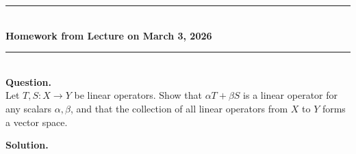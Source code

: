 \documentclass{article}
\begin{document}
\bigskip
\begin{center}
\rule{0.5\textwidth}{1pt}\\[6pt]
\textbf{Homework from Lecture on March 3, 2026}\\[2pt]
\rule{0.5\textwidth}{1pt}
\end{center}
\bigskip

\hfill \break  $~\!\!$ \dotfill \medskip \\
\textbf{Question.}\\
Let $T, S : X \to Y$ be linear operators. Show that $\alpha T + \beta S$ is a linear operator for any scalars $\alpha, \beta$, and that the collection of all linear operators from $X$ to $Y$ forms a vector space.

\vspace{0.5cm}
\noindent
\textbf{Solution.}\\
\quad\\
\end{document}
